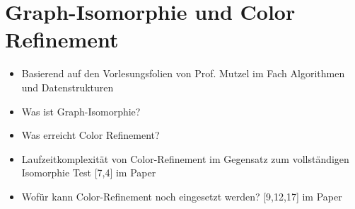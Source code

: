 \section{Graph-Isomorphie und Color Refinement}
\label{sec/gi_cr}

\begin{itemize}
	\item Basierend auf den Vorlesungsfolien von Prof. Mutzel im Fach Algorithmen und Datenstrukturen
	\item Was ist Graph-Isomorphie?
	\item Was erreicht Color Refinement?
	\item Laufzeitkomplexität von Color-Refinement im Gegensatz zum vollständigen Isomorphie Test [7,4] im Paper
	\item Wofür kann Color-Refinement noch eingesetzt werden? [9,12,17] im Paper
\end{itemize}